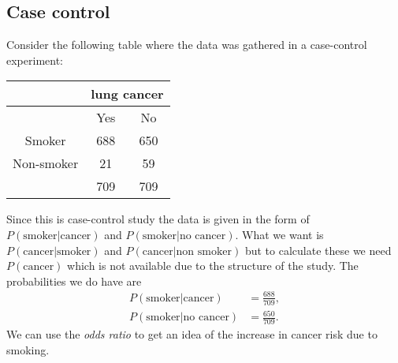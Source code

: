 \subsection{Case control}
Consider the following table where the data was gathered in a case-control experiment:
\begin{center}
    \begin{tabular}{c|cc}
        &\multicolumn{2}{c}{lung cancer}\\
        \hline 
        &Yes&No\\
        \hline 
        Smoker&688 &650\\
        Non-smoker&21&59\\
        \hline 
        &709&709
        
    \end{tabular}
\end{center}
Since this is case-control study the data is given in the form of $P(\text{smoker}|\text{cancer})$ and $P(\text{smoker}|\text{no cancer})$. What we want is $P(\text{cancer}|\text{smoker})$ and $P(\text{cancer}|\text{non smoker})$ but to calculate these we need $P(\text{cancer})$ which is not available due to the structure of the study. The probabilities we do have are
\begin{align*}
    P(\text{smoker}|\text{cancer})&= \frac{688}{709},\\
    P(\text{smoker}|\text{no cancer}) &=\frac{650}{709}.
\end{align*}
We can use the \emph{odds ratio} to get an idea of the increase in cancer risk due to smoking. 
